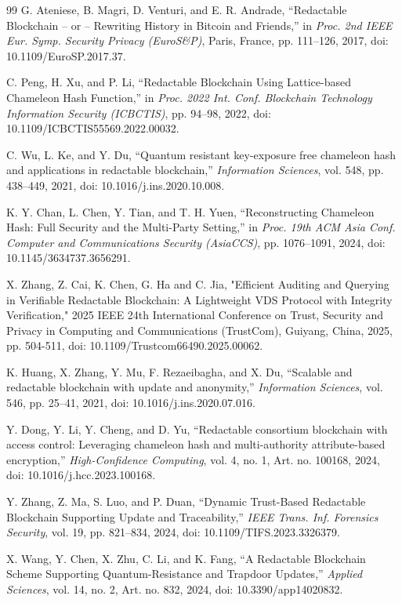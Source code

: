 \documentclass[lettersize,journal]{IEEEtran}
\begin{document}
\begin{thebibliography}{99}
G. Ateniese, B. Magri, D. Venturi, and E. R. Andrade,
``Redactable Blockchain -- or -- Rewriting History in Bitcoin and Friends,''
in \textit{Proc. 2nd IEEE Eur. Symp. Security Privacy (EuroS\&P)},
Paris, France, pp. 111--126, 2017,
doi: 10.1109/EuroSP.2017.37.

C. Peng, H. Xu, and P. Li,
``Redactable Blockchain Using Lattice-based Chameleon Hash Function,''
in \textit{Proc. 2022 Int. Conf. Blockchain Technology Information Security (ICBCTIS)},
pp. 94--98, 2022,
doi: 10.1109/ICBCTIS55569.2022.00032.

C. Wu, L. Ke, and Y. Du,
``Quantum resistant key-exposure free chameleon hash and applications in redactable blockchain,''
\textit{Information Sciences}, vol. 548, pp. 438--449, 2021,
doi: 10.1016/j.ins.2020.10.008.

K. Y. Chan, L. Chen, Y. Tian, and T. H. Yuen,
``Reconstructing Chameleon Hash: Full Security and the Multi-Party Setting,''
in \textit{Proc. 19th ACM Asia Conf. Computer and Communications Security (AsiaCCS)},
pp. 1076--1091, 2024,
doi: 10.1145/3634737.3656291.

X. Zhang, Z. Cai, K. Chen, G. Ha and C. Jia, "Efficient Auditing and Querying in Verifiable Redactable Blockchain: A Lightweight VDS Protocol with Integrity Verification," 2025 IEEE 24th International Conference on Trust, Security and Privacy in Computing and Communications (TrustCom), Guiyang, China, 2025, pp. 504-511, doi: 10.1109/Trustcom66490.2025.00062.

K. Huang, X. Zhang, Y. Mu, F. Rezaeibagha, and X. Du,
``Scalable and redactable blockchain with update and anonymity,''
\textit{Information Sciences}, vol. 546, pp. 25--41, 2021,
doi: 10.1016/j.ins.2020.07.016.

Y. Dong, Y. Li, Y. Cheng, and D. Yu,
``Redactable consortium blockchain with access control: Leveraging chameleon hash and multi-authority attribute-based encryption,''
\textit{High-Confidence Computing}, vol. 4, no. 1, Art. no. 100168, 2024,
doi: 10.1016/j.hcc.2023.100168.

Y. Zhang, Z. Ma, S. Luo, and P. Duan,
``Dynamic Trust-Based Redactable Blockchain Supporting Update and Traceability,''
\textit{IEEE Trans. Inf. Forensics Security}, vol. 19, pp. 821--834, 2024,
doi: 10.1109/TIFS.2023.3326379.

X. Wang, Y. Chen, X. Zhu, C. Li, and K. Fang,
``A Redactable Blockchain Scheme Supporting Quantum-Resistance and Trapdoor Updates,''
\textit{Applied Sciences}, vol. 14, no. 2, Art. no. 832, 2024,
doi: 10.3390/app14020832.


\end{thebibliography}
\end{document}
